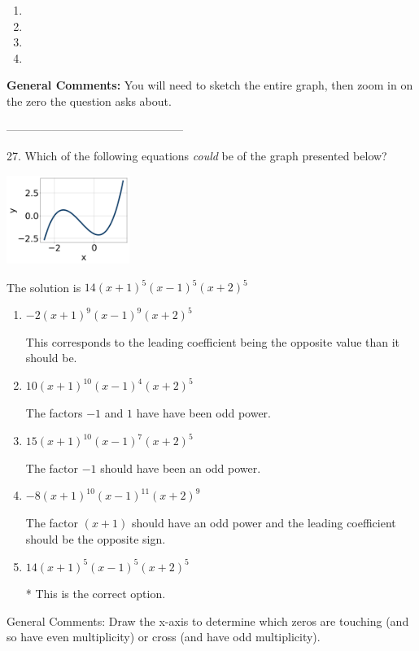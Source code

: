 \documentclass{extbook}[14pt]
\begin{document}
\begin{enumerate}[label=\Alph*.] 
\item   
\item   
\item   
\item   
\end{enumerate} 
 
\textbf{General Comments:} You will need to sketch the entire graph, then zoom in on the zero the question asks about.

-----------------------------------------------

27. Which of the following equations \textit{could} be of the graph presented below?
\begin{center} \includegraphics[width=0.3\textwidth]{../Figures/polyGraphToFunctionB.png} \end{center} 

The solution is $ 14(x + 1)^{5} (x - 1)^{5} (x + 2)^{5} $ 

\begin{enumerate}[label=\Alph*.] 
\item $ -2(x + 1)^{9} (x - 1)^{9} (x + 2)^{5} $ 

 This corresponds to the leading coefficient being the opposite value than it should be. 
\item $ 10(x + 1)^{10} (x - 1)^{4} (x + 2)^{5} $ 

 The factors $-1$ and $1$ have have been odd power. 
\item $ 15(x + 1)^{10} (x - 1)^{7} (x + 2)^{5} $ 

 The factor $-1$ should have been an odd power. 
\item $ -8(x + 1)^{10} (x - 1)^{11} (x + 2)^{9} $ 

 The factor $(x + 1)$ should have an odd power and the leading coefficient should be the opposite sign. 
\item $ 14(x + 1)^{5} (x - 1)^{5} (x + 2)^{5} $ 

 * This is the correct option. 
\end{enumerate} 
 
General Comments: Draw the x-axis to determine which zeros are touching (and so have even multiplicity) or cross (and have odd multiplicity).
\end{document}
